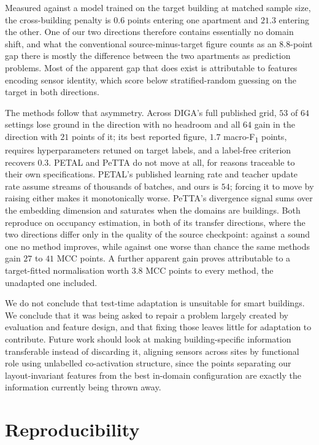 \documentclass[a4paper,fleqn]{cas-dc}
\newcommand{\macf}{macro-F\textsubscript{1}}
\begin{document}
Measured against a model trained on the target building at matched sample size, the
cross-building penalty is $0.6$ points entering one apartment and $21.3$ entering the
other. One of our two directions therefore contains essentially no domain shift, and what
the conventional source-minus-target figure counts as an $8.8$-point gap there is mostly
the difference between the two apartments as prediction problems. Most of the apparent gap
that does exist is attributable to features encoding sensor identity, which score below
stratified-random guessing on the target in both directions.

The methods follow that asymmetry. Across DIGA's full published grid, $53$ of $64$
settings lose ground in the direction with no headroom and all $64$ gain in the direction
with $21$ points of it; its best reported figure, $1.7$ \macf{} points, requires
hyperparameters retuned on target labels, and a label-free criterion recovers $0.3$.
PETAL and PeTTA do not move at all, for reasons traceable to their own specifications.
PETAL's published learning rate and teacher update rate assume streams of thousands of
batches, and ours is $54$; forcing it to move by raising either makes it monotonically
worse. PeTTA's divergence signal sums over the embedding dimension and saturates when the
domains are buildings. Both reproduce on occupancy estimation, in both of its transfer
directions, where the two directions differ only in the quality of the source checkpoint:
against a sound one no method improves, while against one worse than chance the same
methods gain $27$ to $41$ MCC points. A further apparent gain proves attributable to a
target-fitted normalisation worth $3.8$ MCC points to every method, the unadapted one
included.

We do not conclude that test-time adaptation is unsuitable for smart buildings. We conclude
that it was being asked to repair a problem largely created by evaluation and feature
design, and that fixing those leaves little for adaptation to contribute. Future work
should look at making building-specific information transferable instead of discarding
it, aligning sensors across sites by functional role using unlabelled co-activation
structure, since the points separating our layout-invariant features from the
best in-domain configuration are exactly the information currently being thrown away.

\section*{Reproducibility}
\end{document}
